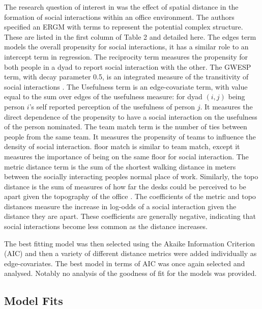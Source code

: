 \documentclass[
]{statsoc}
\begin{document}
The research question of interest in \cite{Sailer2012} was the effect of
spatial distance in the formation of social interactions within an
office environment. The authors specified an ERGM with terms to
represent the potential complex structure. These are listed in the first
column of Table 2 and detailed here. The edges term models the overall
propensity for social interactions, it has a similar role to an
intercept term in regression. The reciprocity term measures the
propensity for both people in a dyad to report social interaction with
the other. The GWESP term, with decay parameter 0.5, is an integrated
measure of the transitivity of social interactions
\citep[See][for a detailed
explanation]{snijders2006}. The Usefulness term is an edge-covariate
term, with value equal to the sum over edges of the usefulness measure:
for dyad \((i,j)\) being person \(i\)'s self reported perception of the
usefulness of person \(j\). It measures the direct dependence of the
propensity to have a social interaction on the usefulness of the person
nominated. The team match term is the number of ties between people from
the same team. It measures the propensity of teams to influence the
density of social interaction. floor match is similar to team match,
except it measures the importance of being on the same floor for social
interaction. The metric distance term is the sum of the shortest walking
distance in meters between the socially interacting peoples normal place
of work. Similarly, the topo distance is the sum of measures of how far
the desks could be perceived to be apart given the topography of the
office \citep[See][for precise definitions]{Sailer2012}. The
coefficients of the metric and topo distances measure the increase in
log-odds of a social interaction given the distance they are apart.
These coefficients are generally negative, indicating that social
interactions become less common as the distance increases.

The best fitting model was then selected using the Akaike Information
Criterion (AIC) and then a variety of different distance metrics were
added individually as edge-covariates. The best model in terms of AIC
was once again selected and analysed. Notably no analysis of the
goodness of fit for the models was provided.

\subsection{Model Fits}
\end{document}
